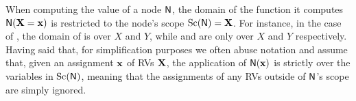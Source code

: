When computing the value of a node $\operatorname{\textup{\textsf{N}}}$, the domain of the function it computes
$\operatorname{\textup{\textsf{N}}}(\mathbf{X}=\mathbf{x})$ is restricted to the node's scope $\operatorname*{\normalfont{Sc}}(\operatorname{\textup{\textsf{N}}})=\mathbf{X}$. For instance, in
the case of , the domain of \inode[fill=boxgreen]{\newProdNode} is over $X$ and
$Y$, while \inode[fill=boxred!70]{\newSumNode} and \inode[fill=boxpurple!60]{\newSumNode} are only
over $X$ and $Y$ respectively. Having said that, for simplification purposes we often abuse
notation and assume that, given an assignment $\mathbf{x}$ of RVs $\mathbf{X}$, the application of
$\operatorname{\textup{\textsf{N}}}(\mathbf{x})$ is strictly over the variables in $\operatorname*{\normalfont{Sc}}(\operatorname{\textup{\textsf{N}}})$, meaning that the assignments of
any RVs outside of $\operatorname{\textup{\textsf{N}}}$'s scope are simply ignored.

\newcommand\xmone{2}%
\newcommand\xsone{0.5}%
\newcommand\xmtwo{4}%
\newcommand\xstwo{0.8}%
\newcommand\ymone{3}%
\newcommand\ysone{0.7}%
\newcommand\ymtwo{5}%
\newcommand\ystwo{0.4}%
